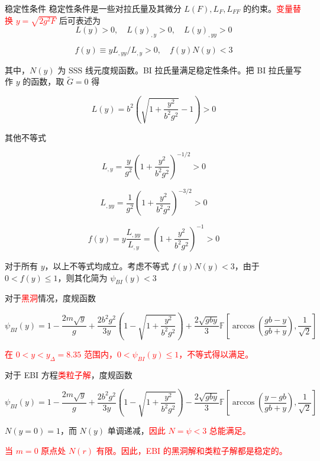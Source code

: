 \documentclass[9pt, dvipsnames]{beamer} %
\begin{document}
\begin{frame}{稳定性条件}
    稳定性条件是一些对拉氏量及其微分 $L(F),L_F,L_{FF}$ 的约束。\textcolor{red}{变量替换 $y=\sqrt{2g^2 F}$} 后可表述为
    $$
    L(y)>0,\quad
    L(y)_{,y}>0,\quad
    L(y)_{,yy}>0 
    $$

    $$
    f(y)
    \equiv yL_{,yy} / L_{,y} > 0,\quad
    f(y) N(y) < 3    
    $$

    其中，$N(y)$ 为 SSS 线元度规函数。BI 拉氏量满足稳定性条件。把 BI 拉氏量写作 $y$ 的函数，取 $\tilde{G}=0$ 得

    $$
    L(y)
    =b^2\left(\sqrt{1+\frac{y^2 }{b^2 g^2 } } - 1 \right) > 0 
    $$

    其他不等式
    
    $$
    L_{,y} = \frac{y }{g^2 } \left(1 + \frac{y^2 }{b^2 g^2 }  \right)^{-1/2} > 0
    $$

    $$
    L_{,yy} = \frac{1 }{g^2 } \left(1 + \frac{y^2 }{b^2 g^2 }  \right)^{-3/2} > 0
    $$

    $$
    f(y) = y\frac{L_{,yy} }{L_{,y} } = \left(1 + \frac{y^2 }{b^2 g^2 }  \right)^{-1} > 0
    $$

\end{frame}

\begin{frame}
    对于所有 $y$，以上不等式均成立。考虑不等式 $f(y)N(y)<3$，由于 $0<f(y)\leqslant 1$，则其化简为 $\psi_{BI}(y)<3$

    对于\textcolor{red}{黑洞}情况，度规函数

    $$
    \psi_{BI}(y)
    =1-\frac{2m\sqrt{y} }{g } + \frac{2b^2 g^2 }{3y } \left(1-\sqrt{1+\frac{y^2 }{b^2 g^2 } } \right) + \frac{2\sqrt{gby} }{3 } \mathbb{F}\left[\arccos\left(\frac{gb-y }{gb+y } \right), \frac{1 }{\sqrt{2} }   \right] 
    $$

    \textcolor{red}{在 $0<y<y_\Delta=8.35$ 范围内，$0<\psi_{BI}(y)\leqslant 1$，不等式得以满足。}

    对于 EBI 方程\textcolor{red}{类粒子解}，度规函数

    $$
    \psi_{BI}(y)
    =1-\frac{2m\sqrt{y} }{g } + \frac{2b^2 g^2 }{3y } \left(1-\sqrt{1+\frac{y^2 }{b^2 g^2 } } \right) - \frac{2\sqrt{gby} }{3 } \mathbb{F}\left[\arccos\left(\frac{y-gb }{gb+y } \right), \frac{1 }{\sqrt{2} } \right]
    $$

    $N(y=0)=1$，而 $N(y)$ 单调递减，\textcolor{red}{因此 $N=\psi<3$ 总能满足。}

    \textcolor{red}{当 $m=0$ 原点处 $N(r)$ 有限。因此，EBI 的黑洞解和类粒子解都是稳定的。}

\end{frame}
\end{document}
